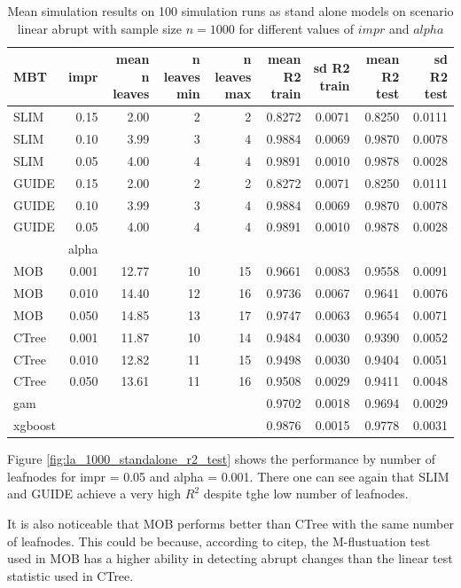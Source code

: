 \begin{table}

\caption{Mean simulation results on 100 simulation runs as stand alone models on scenario linear abrupt with sample size $n = 1000$ for different values of $impr$ and $alpha$}
\centering \tiny
\begin{tabular}[t]{l|r|r|r|r|r|r|r|r}
\hline
MBT & impr & mean n leaves & n leaves min & n leaves max & mean R2 train & sd R2 train & mean R2 test & sd R2 test\\
\hline
SLIM & 0.15 & 2.00 & 2 & 2 & 0.8272 & 0.0071 & 0.8250 & 0.0111\\
SLIM & 0.10 & 3.99 & 3 & 4 & 0.9884 & 0.0069 & 0.9870 & 0.0078\\
SLIM & 0.05 & 4.00 & 4 & 4 & 0.9891 & 0.0010 & 0.9878 & 0.0028\\
GUIDE & 0.15 & 2.00 & 2 & 2 & 0.8272 & 0.0071 & 0.8250 & 0.0111\\
GUIDE & 0.10 & 3.99 & 3 & 4 & 0.9884 & 0.0069 & 0.9870 & 0.0078\\
GUIDE & 0.05 & 4.00 & 4 & 4 & 0.9891 & 0.0010 & 0.9878 & 0.0028\\
\hline
 & alpha & & & & & & & \\
\hline
MOB & 0.001 & 12.77 & 10 & 15 & 0.9661 & 0.0083 & 0.9558 & 0.0091\\
MOB & 0.010 & 14.40 & 12 & 16 & 0.9736 & 0.0067 & 0.9641 & 0.0076\\
MOB & 0.050 & 14.85 & 13 & 17 & 0.9747 & 0.0063 & 0.9654 & 0.0071\\
CTree & 0.001 & 11.87 & 10 & 14 & 0.9484 & 0.0030 & 0.9390 & 0.0052\\
CTree & 0.010 & 12.82 & 11 & 15 & 0.9498 & 0.0030 & 0.9404 & 0.0051\\
CTree & 0.050 & 13.61 & 11 & 16 & 0.9508 & 0.0029 & 0.9411 & 0.0048\\
\hline
gam & & & & & 0.9702 & 0.0018 & 0.9694 & 0.0029\\
xgboost & & & & & 0.9876 & 0.0015 & 0.9778 & 0.0031\\
\hline
\end{tabular}
\label{tab:linear_abrupt_summary} 
\end{table}


Figure \ref{fig:la_1000_standalone_r2_test} shows the performance by number of leafnodes for impr = 0.05 and alpha = 0.001. There one can see again that SLIM and GUIDE achieve a very high $R^2$ despite tghe low number of leafnodes. 

It is also noticeable that MOB performs better than CTree with the same number of leafnodes.
This could be because, according to citep{\citep{Schlosser.2019}}, the M-flustuation test used in MOB has a higher ability in detecting abrupt changes than the linear test statistic used in CTree.

